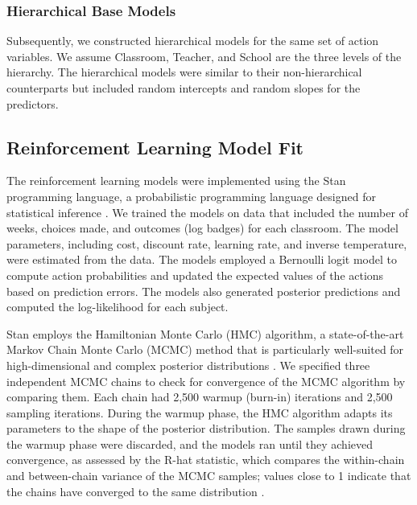 \documentclass[
  number,
  preprint,
  3p,
  onecolumn]{elsarticle}
\begin{document}
\hypertarget{hierarchical-base-models}{%
\subsubsection{Hierarchical Base
Models}\label{hierarchical-base-models}}

Subsequently, we constructed hierarchical models for the same set of
action variables. We assume Classroom, Teacher, and School are the three
levels of the hierarchy. The hierarchical models were similar to their
non-hierarchical counterparts but included random intercepts and random
slopes for the predictors.

\hypertarget{reinforcement-learning-model-fit}{%
\subsection{Reinforcement Learning Model
Fit}\label{reinforcement-learning-model-fit}}

The reinforcement learning models were implemented using the Stan
programming language, a probabilistic programming language designed for
statistical inference \citep{stanmod2022, gabry2022}. We trained the
models on data that included the number of weeks, choices made, and
outcomes (log badges) for each classroom. The model parameters,
including cost, discount rate, learning rate, and inverse temperature,
were estimated from the data. The models employed a Bernoulli logit
model to compute action probabilities and updated the expected values of
the actions based on prediction errors. The models also generated
posterior predictions and computed the log-likelihood for each subject.

Stan employs the Hamiltonian Monte Carlo (HMC) algorithm, a
state-of-the-art Markov Chain Monte Carlo (MCMC) method that is
particularly well-suited for high-dimensional and complex posterior
distributions \citep{betancourt2017}. We specified three independent
MCMC chains to check for convergence of the MCMC algorithm by comparing
them. Each chain had 2,500 warmup (burn-in) iterations and 2,500
sampling iterations. During the warmup phase, the HMC algorithm adapts
its parameters to the shape of the posterior distribution. The samples
drawn during the warmup phase were discarded, and the models ran until
they achieved convergence, as assessed by the R-hat statistic, which
compares the within-chain and between-chain variance of the MCMC
samples; values close to 1 indicate that the chains have converged to
the same distribution \citep{gelman1992}.
\end{document}
